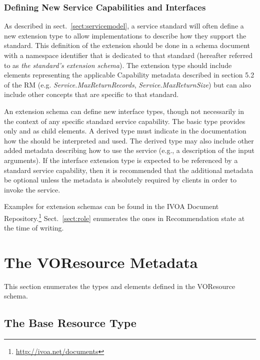 \documentclass[11pt,a4paper]{ivoa}
\begin{document}
\subsubsection{Defining New Service Capabilities and Interfaces}
\label{sect:serviceelements}


As described in sect.~\ref{sect:servicemodel}, a service
standard will often define a new  extension
type to allow implementations to describe how they support the
standard.  This definition of the  extension
should be done in a schema document with a namespace identifier that
is dedicated to that standard (hereafter referred to as \emph{the
standard's extension schema}).  The extension type should include
elements representing the applicable Capability metadata described in
section 5.2 of the RM
(e.g. \emph{Service.MaxReturnRecords}, \emph{Service.MaxReturnSize})
but can also include other concepts that are specific to that standard.


An extension schema can define new interface types, though not
necessarily in the context of any specific standard service
capability.  The basic  type provides only
 and  as child
elements.  A derived  type must indicate in
the documentation how the  should be
interpreted and used.  The derived type may also include other added
metadata describing how to use the service (e.g., a description of the
input arguments).  If the interface extension type is expected to be
referenced by a standard service capability, then it is recommended
that the additional metadata be optional unless the metadata is
absolutely required by clients in order to invoke the service.


Examples for extension schemas can be found in the IVOA Document
Repository.\footnote{\url{http://ivoa.net/documents}}
Sect.~\ref{sect:role} enumerates the ones in Recommendation state at the
time of writing.


\section{The VOResource Metadata}
\label{sect:metadata}


This section enumerates the types and elements defined in the
VOResource schema.


\subsection{The Base Resource Type}
\end{document}
